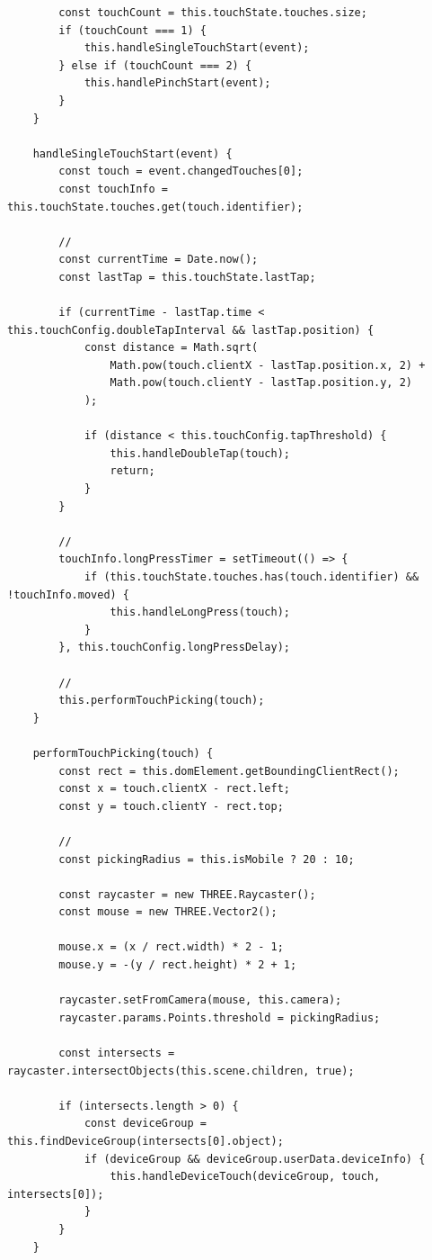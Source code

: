\begin{verbatim}
        const touchCount = this.touchState.touches.size;
        if (touchCount === 1) {
            this.handleSingleTouchStart(event);
        } else if (touchCount === 2) {
            this.handlePinchStart(event);
        }
    }
    
    handleSingleTouchStart(event) {
        const touch = event.changedTouches[0];
        const touchInfo = this.touchState.touches.get(touch.identifier);
        
        // 
        const currentTime = Date.now();
        const lastTap = this.touchState.lastTap;
        
        if (currentTime - lastTap.time < this.touchConfig.doubleTapInterval && lastTap.position) {
            const distance = Math.sqrt(
                Math.pow(touch.clientX - lastTap.position.x, 2) +
                Math.pow(touch.clientY - lastTap.position.y, 2)
            );
            
            if (distance < this.touchConfig.tapThreshold) {
                this.handleDoubleTap(touch);
                return;
            }
        }
        
        // 
        touchInfo.longPressTimer = setTimeout(() => {
            if (this.touchState.touches.has(touch.identifier) && !touchInfo.moved) {
                this.handleLongPress(touch);
            }
        }, this.touchConfig.longPressDelay);
        
        // 
        this.performTouchPicking(touch);
    }
    
    performTouchPicking(touch) {
        const rect = this.domElement.getBoundingClientRect();
        const x = touch.clientX - rect.left;
        const y = touch.clientY - rect.top;
        
        // 
        const pickingRadius = this.isMobile ? 20 : 10;
        
        const raycaster = new THREE.Raycaster();
        const mouse = new THREE.Vector2();
        
        mouse.x = (x / rect.width) * 2 - 1;
        mouse.y = -(y / rect.height) * 2 + 1;
        
        raycaster.setFromCamera(mouse, this.camera);
        raycaster.params.Points.threshold = pickingRadius;
        
        const intersects = raycaster.intersectObjects(this.scene.children, true);
        
        if (intersects.length > 0) {
            const deviceGroup = this.findDeviceGroup(intersects[0].object);
            if (deviceGroup && deviceGroup.userData.deviceInfo) {
                this.handleDeviceTouch(deviceGroup, touch, intersects[0]);
            }
        }
    }
    

\end{verbatim}
